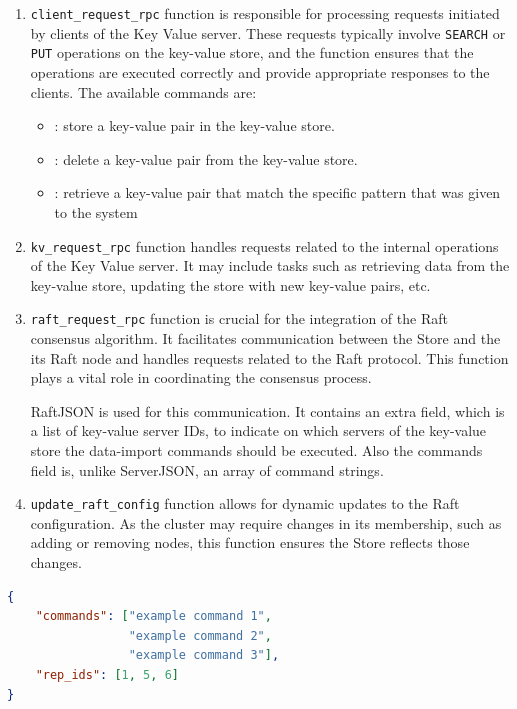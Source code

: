 \documentclass{article}
\begin{document}
\begin{enumerate}
	\item \texttt{client\_request\_rpc} function is responsible for processing requests initiated by clients of the Key Value server. These requests typically involve \texttt{SEARCH} or \texttt{PUT} operations on the key-value store, and the function ensures that the operations are executed correctly and provide appropriate responses to the clients. The available commands are:
		\begin{itemize}
    		\item {}: store a key-value pair in the key-value store.
    		\item {}: delete a key-value pair from the key-value store.
    		\item {}: retrieve a key-value pair that match the specific pattern 
    		that was given to the system
		\end{itemize}
	\item \texttt{kv\_request\_rpc} function handles requests related to the internal operations of the Key Value server. It may include tasks such as retrieving data from the key-value store, updating the store with new key-value pairs, etc.

	\item \texttt{raft\_request\_rpc} function is crucial for the integration of the Raft consensus algorithm. It facilitates communication between the Store and the its Raft node and handles requests related to the Raft protocol. This function plays a vital role in coordinating the consensus process.
		
		RaftJSON is used for this communication. It contains an extra field, which is a list of key-value server IDs, to indicate
		on which servers of the key-value store the data-import commands should be executed. Also
		the commands field is, unlike ServerJSON, an array of command strings.
	\item \texttt{update\_raft\_config} function allows for dynamic updates to the Raft configuration. As the cluster may require changes in its membership, such as adding or removing nodes, this function ensures the Store reflects those changes.

\end{enumerate}

\begin{lstlisting}[language=json, caption={RaftJSON},label={lst:RaftJSON}]
{
    "commands": ["example command 1",
                 "example command 2",
                 "example command 3"],
    "rep_ids": [1, 5, 6]
}
\end{lstlisting}
\end{document}
